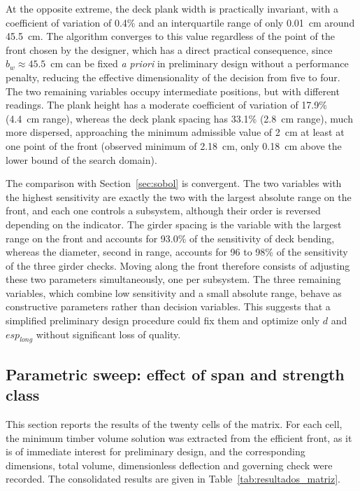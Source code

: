 At the opposite extreme, the deck plank width is practically invariant, with a coefficient of variation of 0.4\% and an interquartile range of only 0.01~cm around 45.5~cm.
The algorithm converges to this value regardless of the point of the front chosen by the designer, which has a direct practical consequence, since $b_w \approx 45.5$~cm can be fixed \textit{a priori} in preliminary design without a performance penalty, reducing the effective dimensionality of the decision from five to four.
The two remaining variables occupy intermediate positions, but with different readings. The plank height has a moderate coefficient of variation of 17.9\% (4.4~cm range), whereas the deck plank spacing has 33.1\% (2.8~cm range), much more dispersed, approaching the minimum admissible value of 2~cm at least at one point of the front (observed minimum of 2.18~cm, only 0.18~cm above the lower bound of the search domain).

The comparison with Section~\ref{sec:sobol} is convergent.
The two variables with the highest sensitivity are exactly the two with the largest absolute range on the front, and each one controls a subsystem, although their order is reversed depending on the indicator. The girder spacing is the variable with the largest range on the front and accounts for 93.0\% of the sensitivity of deck bending, whereas the diameter, second in range, accounts for 96 to 98\% of the sensitivity of the three girder checks.
Moving along the front therefore consists of adjusting these two parameters simultaneously, one per subsystem.
The three remaining variables, which combine low sensitivity and a small absolute range, behave as constructive parameters rather than decision variables. This suggests that a simplified preliminary design procedure could fix them and optimize only $d$ and $esp_{long}$ without significant loss of quality.

\subsection{Parametric sweep: effect of span and strength class}\label{sec:varredura}

This section reports the results of the twenty cells of the matrix.
For each cell, the minimum timber volume solution was extracted from the efficient front, as it is of immediate interest for preliminary design, and the corresponding dimensions, total volume, dimensionless deflection and governing check were recorded.
The consolidated results are given in Table~\ref{tab:resultados_matriz}.

